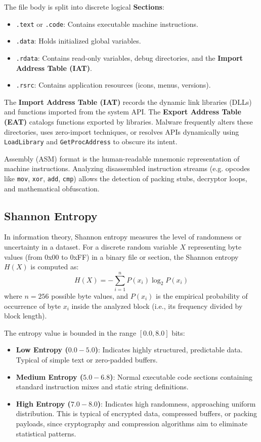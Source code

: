 \documentclass[11pt,a4paper]{article}
\begin{document}
The file body is split into discrete logical \textbf{Sections}:
\begin{itemize}
    \item \texttt{.text} or \texttt{.code}: Contains executable machine instructions.
    \item \texttt{.data}: Holds initialized global variables.
    \item \texttt{.rdata}: Contains read-only variables, debug directories, and the \textbf{Import Address Table (IAT)}.
    \item \texttt{.rsrc}: Contains application resources (icons, menus, versions).
\end{itemize}

The \textbf{Import Address Table (IAT)} records the dynamic link libraries (DLLs) and functions imported from the system API. The \textbf{Export Address Table (EAT)} catalogs functions exported by libraries. Malware frequently alters these directories, uses zero-import techniques, or resolves APIs dynamically using \texttt{LoadLibrary} and \texttt{GetProcAddress} to obscure its intent.

Assembly (ASM) format is the human-readable mnemonic representation of machine instructions. Analyzing disassembled instruction streams (e.g. opcodes like \texttt{mov}, \texttt{xor}, \texttt{add}, \texttt{cmp}) allows the detection of packing stubs, decryptor loops, and mathematical obfuscation.

\subsection{Shannon Entropy}
In information theory, Shannon entropy measures the level of randomness or uncertainty in a dataset. For a discrete random variable $X$ representing byte values (from 0x00 to 0xFF) in a binary file or section, the Shannon entropy $H(X)$ is computed as:
\begin{equation}
    H(X) = - \sum_{i=1}^{n} P(x_i) \log_2 P(x_i)
\end{equation}
where $n = 256$ possible byte values, and $P(x_i)$ is the empirical probability of occurrence of byte $x_i$ inside the analyzed block (i.e., its frequency divided by block length).

The entropy value is bounded in the range $[0.0, 8.0]$ bits:
\begin{itemize}
    \item \textbf{Low Entropy ($0.0 - 5.0$)}: Indicates highly structured, predictable data. Typical of simple text or zero-padded buffers.
    \item \textbf{Medium Entropy ($5.0 - 6.8$)}: Normal executable code sections containing standard instruction mixes and static string definitions.
    \item \textbf{High Entropy ($7.0 - 8.0$)}: Indicates high randomness, approaching uniform distribution. This is typical of encrypted data, compressed buffers, or packing payloads, since cryptography and compression algorithms aim to eliminate statistical patterns.
\end{itemize}
\end{document}

